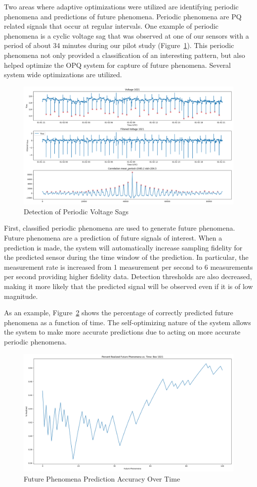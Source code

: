 Two areas where adaptive optimizations were utilized are identifying periodic phenomena and predictions of future phenomena. Periodic phenomena are PQ related signals that occur at regular intervals. One example of periodic phenomena is a cyclic voltage sag that was observed at one of our sensors with a period of about 34 minutes during our pilot study (Figure~\ref{fig:periodic-voltage-sags}). This periodic phenomena not only provided a classification of an interesting pattern, but also helped optimize the OPQ system for capture of future phenomena. Several system wide optimizations are utilized.

\begin{figure}[H]
    \centering
    \includegraphics[width=0.75\linewidth]{images/pilot/periodic-voltage-sags.png}
    \caption{Detection of Periodic Voltage Sags}
    \label{fig:periodic-voltage-sags}
\end{figure}

First, classified periodic phenomena are used to generate future phenomena. Future phenomena are a prediction of future signals of interest. When a prediction is made, the system will automatically increase sampling fidelity for the predicted sensor during the time window of the prediction. In particular, the measurement rate is increased from 1 measurement per second to 6 measurements per second providing higher fidelity data. Detection thresholds are also decreased, making it more likely that the predicted signal will be observed even if it is of low magnitude.

As an example, Figure~\ref{fig:future-phenomena} shows the percentage of correctly predicted future phenomena as a function of time. The self-optimizing nature of the system allows the system to make more accurate predictions due to acting on more accurate periodic phenomena.

\begin{figure}[H]
    \centering
    \includegraphics[width=0.60\linewidth]{images/pilot/realized-future-phenomena.png}
    \caption{Future Phenomena Prediction Accuracy Over Time}
    \label{fig:future-phenomena}
\end{figure}

